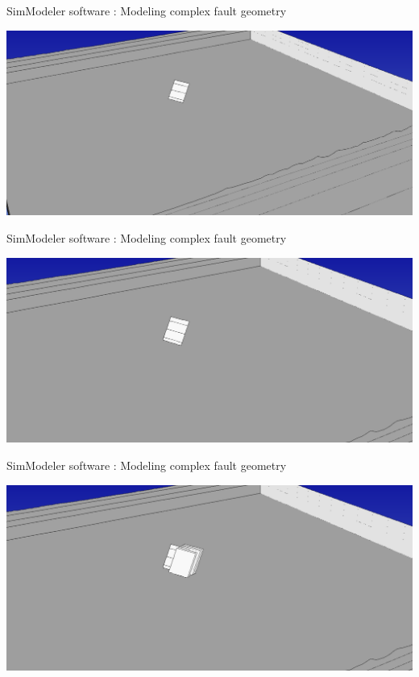 \documentclass{beamer}
\begin{document}
\begin{frame}
 {SimModeler software : Modeling complex fault geometry}
 
 \includegraphics[width=1\linewidth]{images/simmodeler5}
 
\end{frame}

\begin{frame}
 {SimModeler software : Modeling complex fault geometry}
 
 \includegraphics[width=1\linewidth]{images/simmodeler6}
 
\end{frame}

\begin{frame}
 {SimModeler software : Modeling complex fault geometry}
 
 \includegraphics[width=1\linewidth]{images/simmodeler7}
 
\end{frame}
\end{document}

